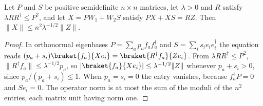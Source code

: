 \begin{lemma}
    \label{lem:ldp_sylvester_bound}
    \leanok
    Let $P$ and $S$ be positive semidefinite $n\times n$ matrices, let $\lambda>0$ and $R$
    satisfy $\lambda RR^\dagger\leq P^2$, and let $X=PW_1+W_2S$ satisfy $PX+XS=RZ$. Then
    $\lVert X\rVert\leq n^2\lambda^{-1/2}\lVert Z\rVert$.
\end{lemma}
\begin{proof}
    \leanok
    In orthonormal eigenbases $P=\sum_ap_af_af_a^\dagger$ and $S=\sum_is_ie_ie_i^\dagger$ the
    equation reads $(p_a+s_i)\braket{f_a}{Xe_i}=\braket{R^\dagger f_a}{Ze_i}$. From
    $\lambda RR^\dagger\leq P^2$, $\lVert R^\dagger f_a\rVert\leq\lambda^{-1/2}p_a$, so
    $\lvert\braket{f_a}{Xe_i}\rvert\leq\lambda^{-1/2}\lVert Z\rVert$ whenever
    $p_a+s_i>0$, since $p_a/(p_a+s_i)\leq1$. When $p_a=s_i=0$ the entry vanishes, because
    $f_a^\dagger P=0$ and $Se_i=0$. The operator norm is at most the sum of the moduli of
    the $n^2$ entries, each matrix unit having norm one.
\end{proof}
